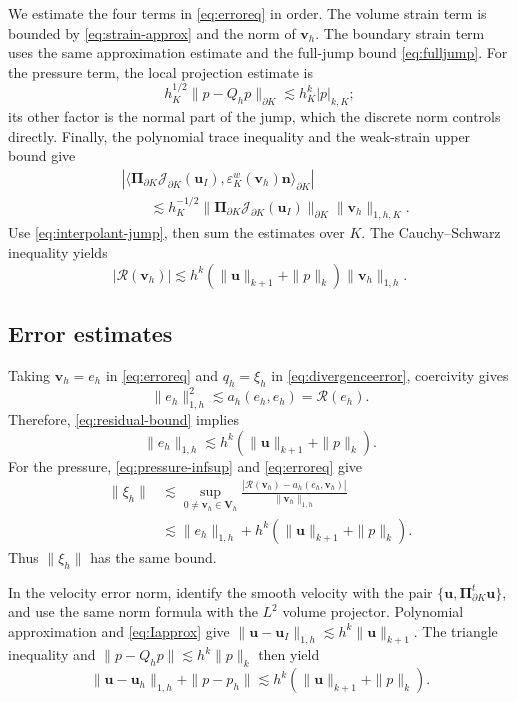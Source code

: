 \documentclass[review,hidelinks,onefignum,onetabnum]{siamart251216}
\newcommand{\AI}[1]{{\color{blue}#1}}
\begin{document}
\AI{We estimate the four terms in \eqref{eq:erroreq} in order.
The volume strain term is bounded by \eqref{eq:strain-approx} and the norm
of $\boldsymbol v_h$. The boundary strain term uses the same approximation
estimate and the full-jump bound \eqref{eq:fulljump}.
For the pressure term, the local projection estimate is
\[
h_K^{1/2}\|p-Q_hp\|_{\partial K}\lesssim h_K^k|p|_{k,K};
\]
its other factor is the normal part of the jump, which the discrete norm
controls directly. Finally, the polynomial trace inequality and the weak-strain
upper bound give
\[
\begin{aligned}
&|\langle\boldsymbol\Pi_{\partial K}\mathcal J_{\partial K}(\boldsymbol u_I),
\varepsilon_K^w(\boldsymbol v_h)\boldsymbol n\rangle_{\partial K}|\\
&\qquad\lesssim h_K^{-1/2}
\|\boldsymbol\Pi_{\partial K}\mathcal J_{\partial K}(\boldsymbol u_I)\|_{\partial K}
\|\boldsymbol v_h\|_{1,h,K}.
\end{aligned}
\]
Use \eqref{eq:interpolant-jump}, then sum the estimates over $K$.
The Cauchy--Schwarz inequality yields
\begin{equation}\label{eq:residual-bound}
|\mathcal R(\boldsymbol v_h)|\lesssim
h^k(\|\boldsymbol u\|_{k+1}+\|p\|_k)\|\boldsymbol v_h\|_{1,h}.
\end{equation}}

\subsection{Error estimates}
Taking $\boldsymbol v_h=e_h$ in \eqref{eq:erroreq} and
$q_h=\xi_h$ in \eqref{eq:divergenceerror}, coercivity gives
\[
\|e_h\|_{1,h}^2\lesssim a_h(e_h,e_h)=\mathcal R(e_h).
\]
Therefore, \eqref{eq:residual-bound} implies
\[
\|e_h\|_{1,h}\lesssim h^k(\|\boldsymbol u\|_{k+1}+\|p\|_k).
\]
\AI{For the pressure, \eqref{eq:pressure-infsup} and \eqref{eq:erroreq} give
\[
\begin{aligned}
\|\xi_h\|&\lesssim\sup_{0\ne\boldsymbol v_h\in\boldsymbol V_h}
\frac{|\mathcal R(\boldsymbol v_h)-a_h(e_h,\boldsymbol v_h)|}{\|\boldsymbol v_h\|_{1,h}}\\
&\lesssim\|e_h\|_{1,h}+h^k(\|\boldsymbol u\|_{k+1}+\|p\|_k).
\end{aligned}
\]
Thus $\|\xi_h\|$ has the same bound.}

\AI{In the velocity error norm, identify the smooth velocity with the pair
$\{\boldsymbol u,\boldsymbol\Pi_{\partial K}^t\boldsymbol u\}$, and use the same
norm formula with the $L^2$ volume projector.
Polynomial approximation and \eqref{eq:Iapprox} give
$\|\boldsymbol u-\boldsymbol u_I\|_{1,h}\lesssim h^k\|\boldsymbol u\|_{k+1}$.
The triangle inequality and $\|p-Q_hp\|\lesssim h^k\|p\|_k$ then yield
\begin{equation}\label{eq:final-error}
\|\boldsymbol u-\boldsymbol u_h\|_{1,h}+\|p-p_h\|
\lesssim h^k(\|\boldsymbol u\|_{k+1}+\|p\|_k).
\end{equation}}
\end{document}
